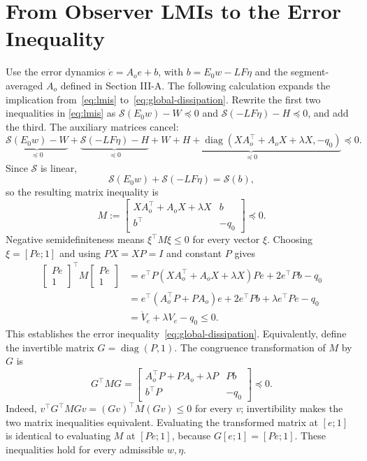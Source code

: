 \documentclass[11pt,a4paper]{article}
\numberwithin{equation}{section}
\theoremstyle{remark}\newtheorem{remark}{Remark}
\newcommand{\diag}{\operatorname{diag}}
\begin{document}
\section{From Observer LMIs to the Error Inequality}\label{app:observer-certificate}
Use the error dynamics $\dot e=A_oe+b$, with $b=E_0w-LF\eta$ and the segment-averaged $A_o$ defined in Section III-A. The following calculation expands the implication from~\eqref{eq:lmis} to~\eqref{eq:global-dissipation}.
Rewrite the first two inequalities in \eqref{eq:lmis} as $\mathcal S(E_0w)-W\preceq0$ and $\mathcal S(-LF\eta)-H\preceq0$, and add the third. The auxiliary matrices cancel:
\[
\underbrace{\mathcal S(E_0w)-W}_{\preceq0}
+\underbrace{\mathcal S(-LF\eta)-H}_{\preceq0}
+\underbrace{W+H+\diag(XA_o^\top+A_oX+\lambda X,-q_0)}_{\preceq0}
\preceq0.
\]
Since $\mathcal S$ is linear,
\[
\mathcal S(E_0w)+\mathcal S(-LF\eta)=\mathcal S(b),
\]
so the resulting matrix inequality is
\[
M:=\begin{bmatrix}
XA_o^\top+A_oX+\lambda X&b\\
b^\top&-q_0
\end{bmatrix}\preceq0.
\]
Negative semidefiniteness means $\xi^\top M\xi\le0$ for every vector $\xi$. Choosing $\xi=[Pe;1]$ and using $PX=XP=I$ and constant $P$ gives
\begin{align*}
\begin{bmatrix}Pe\\1\end{bmatrix}^{\!\top}M\begin{bmatrix}Pe\\1\end{bmatrix}
&=e^\top P(XA_o^\top+A_oX+\lambda X)Pe+2e^\top Pb-q_0\\
&=e^\top(A_o^\top P+PA_o)e+2e^\top Pb+\lambda e^\top Pe-q_0\\
&=\dot V_e+\lambda V_e-q_0\le0.
\end{align*}
This establishes the error inequality~\eqref{eq:global-dissipation}.
Equivalently, define the invertible matrix $G=\diag(P,1)$. The congruence transformation of $M$ by $G$ is
\begin{equation}\label{eq:observer-congruence}
G^\top MG=
\begin{bmatrix}A_o^\top P+PA_o+\lambda P&Pb\\b^\top P&-q_0\end{bmatrix}\preceq0.
\end{equation}
Indeed, $v^\top G^\top MGv=(Gv)^\top M(Gv)\le0$ for every $v$; invertibility makes the two matrix inequalities equivalent. Evaluating the transformed matrix at $[e;1]$ is identical to evaluating $M$ at $[Pe;1]$, because $G[e;1]=[Pe;1]$. These inequalities hold for every admissible $w,\eta$.
\end{document}
